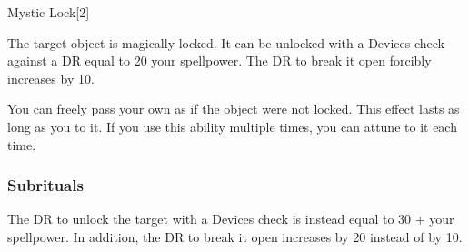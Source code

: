 \begin{spellsection}{Mystic Lock}[2]

\begin{spellcontent}

\begin{spelltargetinginfo}



\end{spelltargetinginfo}


\begin{spelleffects}



\spelleffect
The target object is magically locked.
It can be unlocked with a Devices check against a DR equal to 20 \add your spellpower.
The DR to break it open forcibly increases by 10.

You can freely pass your own  as if the object were not locked.
This effect lasts as long as you  to it.
If you use this ability multiple times, you can attune to it each time.








\end{spelleffects}

\end{spellcontent}
\begin{spellfooter}


\end{spellfooter}
\begin{spellsubcontent}


\end{spellsubcontent}
\end{spellsection}


\subsubsection{Subrituals}



The DR to unlock the target with a Devices check is instead equal to 30 + your spellpower.
In addition, the DR to break it open increases by 20 instead of by 10.






